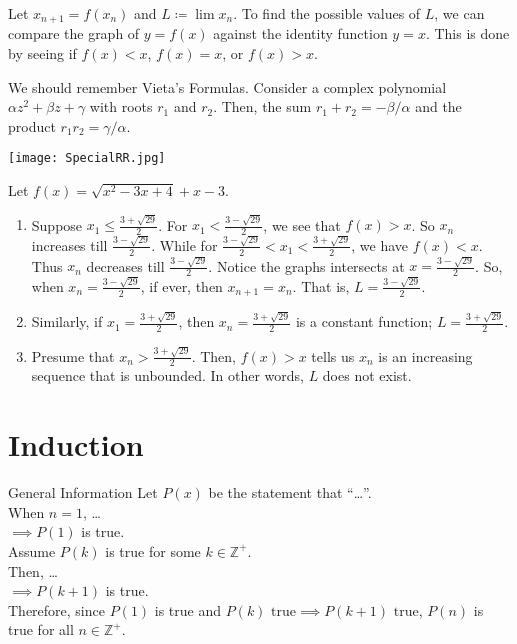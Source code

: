 \documentclass[oneside]{book}
\begin{document}
\begin{note}
  Let \(x_{n+1}=f(x_n)\) and \(L\coloneq \lim{x_n}\). To find the possible values of \(L\), we can compare the graph of \(y=f(x)\) against the identity function \(y=x\). This is done by seeing if \(f(x)<x\), \(f(x)=x\), or \(f(x)>x\).
\end{note}
\begin{note}
  We should remember Vieta's Formulas. Consider a complex polynomial \(\alpha z^2+\beta z+\gamma\) with roots \(r_1\) and \(r_2\). Then, the sum \(r_1+r_2=-\beta/\alpha\) and the product \(r_1r_2=\gamma/\alpha\).
\end{note}
\begin{example}{}{}
  \begin{center}
    \texttt{[image: SpecialRR.jpg]}
  \end{center}
  Let \(f(x)=\sqrt{x^2-3x+4}+x-3\).
  \begin{enumerate}
    \item Suppose \(x_1 \leq \frac{3+\sqrt{29}}{2}\). For \(x_1<\frac{3-\sqrt{29}}{2}\), we see that \(f(x)>x\). So \(x_n\) increases till \(\frac{3-\sqrt{29}}{2}\). While for \(\frac{3-\sqrt{29}}{2}<x_1<\frac{3+\sqrt{29}}{2}\), we have \(f(x)<x\). Thus \(x_n\) decreases till \(\frac{3-\sqrt{29}}{2}\). Notice the graphs intersects at \(x=\frac{3-\sqrt{29}}{2}\). So, when \(x_n=\frac{3-\sqrt{29}}{2}\), if ever, then \(x_{n+1}=x_n\). That is, \(L=\frac{3-\sqrt{29}}{2}\).
    \item Similarly, if \(x_1=\frac{3+\sqrt{29}}{2}\), then \(x_n=\frac{3+\sqrt{29}}{2}\) is a constant function; \(L=\frac{3+\sqrt{29}}{2}\).
    \item Presume that \(x_n>\frac{3+\sqrt{29}}{2}\). Then, \(f(x)>x\) tells us \(x_n\) is an increasing sequence that is unbounded. In other words, \(L\) does not exist.
  \end{enumerate}
\end{example}

\chapter{Induction}
\begin{stbox}{General Information}
  Let \(P(x)\) be the statement that ``\ldots''.\\[3mm] 
  When \(n=1\), \ldots\\[3mm]
  \(\implies P(1)\) is true.\\[3mm]
  Assume \(P(k)\) is true for some \(k \in \mathbb{Z}^{+}\).\\[3mm]
  Then, \ldots\\[3mm]
  \(\implies P(k+1)\) is true.\\[3mm]
  Therefore, since \(P(1)\) is true and \(P(k)\text{ true}\implies P(k+1)\text{ true}\), \(P(n)\) is true for all \(n \in \mathbb{Z}^{+}\).
\end{stbox}
\end{document}
